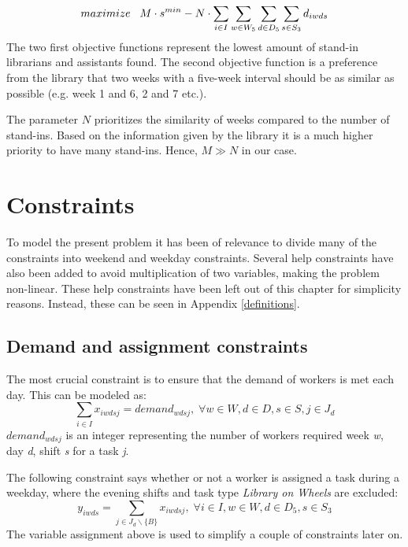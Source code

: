 \begin{equation} \label{objfcn}
maximize \hspace{0.3cm} M\cdot s^{min} - N \cdot \sum_{i \in I}\sum_{w \in W_5}\sum_{d \in D_5}\sum_{s \in S_3} d_{iwds}
\end{equation}
The two first objective functions represent the lowest amount of stand-in librarians and assistants found. The second objective function is a preference from the library that two weeks with a five-week interval should be as similar as possible (e.g. week 1 and 6, 2 and 7 etc.).

The parameter $N$ prioritizes the similarity of weeks compared to the number of stand-ins. Based on the information given by the library it is a much higher priority to have many stand-ins. Hence, $M \gg N$ in our case.




\section{Constraints} \label{constraints}
To model the present problem it has been of relevance to divide many of the constraints into weekend and weekday constraints. Several help constraints have also been added to avoid multiplication of two variables, making the problem non-linear. These help constraints have been left out of this chapter for simplicity reasons. Instead, these can be seen in Appendix \ref{definitions}.

\subsection{Demand and assignment constraints} \label{section:demand_ass_constraints}
The most crucial constraint is to ensure that the demand of workers is met each day. This can be modeled as:
\begin{equation} \label{eq:demand}
\sum_{i \in I} x_{iwdsj} = demand_{wdsj}, \; \forall w\in W,d\in D,s\in S,j\in J_d
\end{equation}
$demand_{wdsj}$ is an integer representing the number of workers required week \textit{w}, day \textit{d}, shift \textit{s} for a task \textit{j}.

The following constraint says whether or not a worker is assigned a task during a weekday, where the evening shifts and task type \textit{Library on Wheels} are excluded:
\begin{equation} \label{constr:y_assign}
y_{iwds} = \sum_{j \in J_d\backslash \{B\}} x_{iwdsj}, \; \forall i \in I, w \in W, d \in D_5, s \in S_3
\end{equation}
The variable assignment above is used to simplify a couple of constraints later on.


